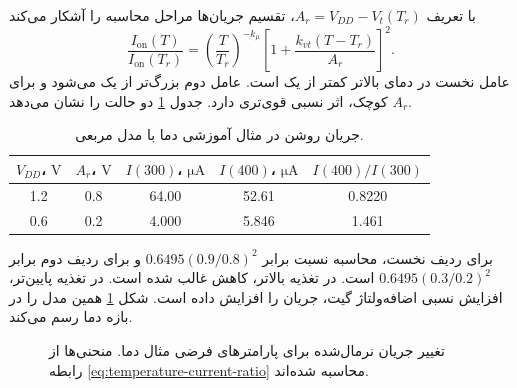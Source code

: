 با تعریف \(A_r=V_{DD}-V_t(T_r)\)، تقسیم جریان‌ها مراحل محاسبه را
آشکار می‌کند
\begin{equation}
 \frac{I_{\mathrm{on}}(T)}{I_{\mathrm{on}}(T_r)}
 =\left(\frac{T}{T_r}\right)^{-k_\mu}
 \left[1+\frac{k_{vt}(T-T_r)}{A_r}\right]^2.
 \label{eq:temperature-current-ratio}
\end{equation}
عامل نخست در دمای بالاتر کمتر از یک است. عامل دوم بزرگ‌تر از یک
می‌شود و برای \(A_r\) کوچک، اثر نسبی قوی‌تری دارد.
جدول \ref{tab:temperature-on-results} دو حالت را نشان می‌دهد.
\begin{table}[!htbp]
\centering
\small
\caption{جریان روشن در مثال آموزشی دما با مدل مربعی.}
\label{tab:temperature-on-results}
\begin{tabular}{ccccc}
\toprule
\(V_{DD}\)، \(\unit{\volt}\) & \(A_r\)، \(\unit{\volt}\) &
\(I(300)\)، \(\unit{\micro\ampere}\) &
\(I(400)\)، \(\unit{\micro\ampere}\) & \(I(400)/I(300)\)\\
\midrule
\num{1.2} & \num{0.8} & \num{64.00} & \num{52.61} & \num{0.8220}\\
\num{0.6} & \num{0.2} & \num{4.000} & \num{5.846} & \num{1.461}\\
\bottomrule
\end{tabular}
\end{table}
برای ردیف نخست، محاسبه نسبت برابر
\(0.6495(0.9/0.8)^2\) و برای ردیف دوم برابر
\(0.6495(0.3/0.2)^2\) است. در تغذیه بالاتر، کاهش
 غالب شده است. در تغذیه پایین‌تر، افزایش نسبی
اضافه‌ولتاژ گیت، جریان را افزایش داده است. شکل
\ref{fig:temperature-on-ratio} همین مدل را در بازه دما رسم می‌کند.
\begin{figure}[!htbp]
\centering
\begin{latin}
\PersianMathDigits
{}
\end{latin}
\caption{تغییر جریان نرمال‌شده برای پارامترهای فرضی مثال دما.
منحنی‌ها از رابطه \eqref{eq:temperature-current-ratio} محاسبه شده‌اند.}
\label{fig:temperature-on-ratio}
\end{figure}

